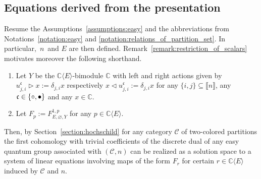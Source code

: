 \documentclass[10pt,a4paper]{amsart}
\numberwithin{equation}{section}
\newcommand{\freealg}[2]{#1\langle #2\rangle}
\newcommand{\HSuafuncx}[5]{F^{#1,#5}_{#2,#3,#4}}
\newcommand{\thefuncx}[1]{F_{#1}}
\newcommand{\comps}{\mathbb{C}}
\newcommand{\dwi}[1]{\llbracket{#1}\rrbracket}
\newcommand{\Sleftmoduleaction}{\triangleright}
\newcommand{\Srightmoduleaction}{\triangleleft}
\newcommand{\blpoint}{\mathnormal{\bullet}}
\newcommand{\whpoint}{\mathnormal{\circ}}
\newcommand{\blaw}{\{\whpoint,\blpoint\}}
\newcommand{\Yc}[1]{\mathfrak{#1}}
\newcommand{\kron}[2]{\delta_{#1,#2}}
\newcommand{\thedim}{n}
\newcommand{\thegens}{E}
\newcommand{\theuni}{u}
\newcommand{\theunix}[3]{\theuni^{#1}_{#2,#3}}
\newcommand{\thecat}{\mathcal{C}}
\newcommand{\theresmodule}{Y}
\begin{document}
\subsection{Equations derived from the presentation}
\label{section:main-one-equations}
 Resume the As\-sump\-tions~\ref{assumptions:easy} and the abbreviations from Notations~\ref{notation:easy} and \ref{notation:relations_of_partition_set}.  In particular,~$\thedim$~and $\thegens$ are then defined.
 Remark~\ref{remark:restriction_of_scalars} mo\-ti\-va\-tes moreover the fol\-lo\-wing short\-hand.

\begin{Notation}\quad
  \newcommand{\ascalar}{x}
  \newcommand{\acol}{\Yc{c}}
  \newcommand{\indi}{i}
  \newcommand{\indj}{j}
  \newcommand{\anypoly}{p}
  \newcommand{\thepolys}{\freealg{\comps}{\thegens}}
  \newcommand{\thepartition}{p}
  \newcommand{\thepartitionset}{\mathcal{S}}
  \newcommand{\incol}{\Yc{c}}
  \newcommand{\outcol}{\Yc{d}}
  \newcommand{\infree}{g}
  \newcommand{\outfree}{j}
  \begin{enumerate}
  \item Let
    $\theresmodule$ be the $\comps\langle\thegens\rangle$-bimodule  $\comps$ with left and right actions given by $\theunix{\acol}{\indj}{\indi}\Sleftmoduleaction \ascalar:= \kron{\indj}{\indi}\ascalar$ respectively $ \ascalar\Srightmoduleaction\theunix{\acol}{\indj}{\indi}:= \kron{\indj}{\indi}\ascalar$ for any $\{\indi,\indj\}\subseteq \dwi{\thedim}$, any $\acol\in\blaw$ and any $\ascalar\in\comps$.
\item Let $\thefuncx{\anypoly}:= \HSuafuncx{1}{\thegens}{\varnothing}{\theresmodule}{\anypoly}$ for any $\anypoly\in\thepolys$.
  \end{enumerate}
\end{Notation}
{
  \newcommand{\anypoly}{r}
  \newcommand{\thepolys}{\freealg{\comps}{\thegens}}
  Then, by Section~\ref{section:hochschild} for any category $\thecat$ of two-colored partitions the first cohomology with trivial coefficients of the discrete dual of any easy quantum group associated with $(\thecat,\thedim)$ can be realized as a solution space to a system of linear equations involving maps of the form $\thefuncx{\anypoly}$ for certain $\anypoly\in\thepolys$ induced by $\thecat$ and $\thedim$.
}
\end{document}
